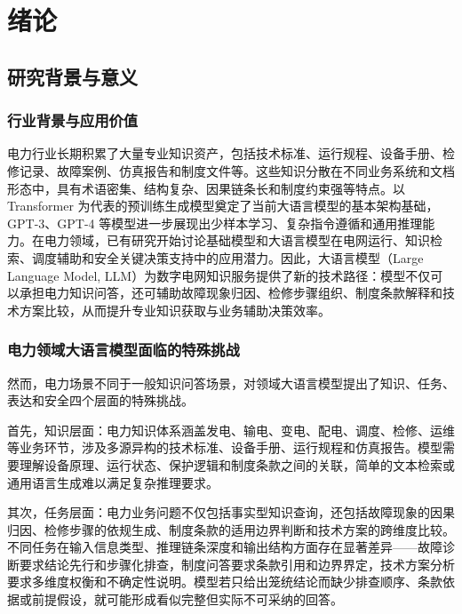 \documentclass[fontset=fandol,type=master,campus=shenzhen,etitleauto=true]{hithesisbook}
\begin{document}
\makecover
\tableofcontents

\mainmatter
\chapter{绪论}\label{ux7eeaux8bba}

\section{研究背景与意义}\label{ux7814ux7a76ux80ccux666fux4e0eux610fux4e49}

\subsection{行业背景与应用价值}

电力行业长期积累了大量专业知识资产，包括技术标准、运行规程、设备手册、检修记录、故障案例、仿真报告和制度文件等。这些知识分散在不同业务系统和文档形态中，具有术语密集、结构复杂、因果链条长和制度约束强等特点。以 Transformer 为代表的预训练生成模型奠定了当前大语言模型的基本架构基础\cite{ref1}，GPT-3、GPT-4 等模型进一步展现出少样本学习、复杂指令遵循和通用推理能力\cite{ref2,ref3}。在电力领域，已有研究开始讨论基础模型和大语言模型在电网运行、知识检索、调度辅助和安全关键决策支持中的应用潜力\cite{ref4,ref5}。因此，大语言模型（Large Language Model, LLM）为数字电网知识服务提供了新的技术路径：模型不仅可以承担电力知识问答，还可辅助故障现象归因、检修步骤组织、制度条款解释和技术方案比较，从而提升专业知识获取与业务辅助决策效率。

\subsection{电力领域大语言模型面临的特殊挑战}

然而，电力场景不同于一般知识问答场景，对领域大语言模型提出了知识、任务、表达和安全四个层面的特殊挑战。

首先，知识层面：电力知识体系涵盖发电、输电、变电、配电、调度、检修、运维等业务环节，涉及多源异构的技术标准、设备手册、运行规程和仿真报告。模型需要理解设备原理、运行状态、保护逻辑和制度条款之间的关联，简单的文本检索或通用语言生成难以满足复杂推理要求。

其次，任务层面：电力业务问题不仅包括事实型知识查询，还包括故障现象的因果归因、检修步骤的依规生成、制度条款的适用边界判断和技术方案的跨维度比较。不同任务在输入信息类型、推理链条深度和输出结构方面存在显著差异——故障诊断要求结论先行和步骤化排查，制度问答要求条款引用和边界界定，技术方案分析要求多维度权衡和不确定性说明。模型若只给出笼统结论而缺少排查顺序、条款依据或前提假设，就可能形成看似完整但实际不可采纳的回答。
\end{document}
